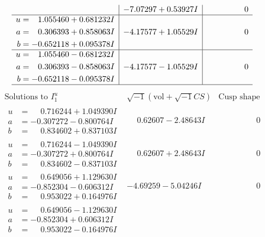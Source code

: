 \documentclass[1p]{elsarticle_modified}
\theoremstyle{definition}
\newcommand{\I}{\sqrt{-1}}
\begin{document}
$$\begin{array}{c|c|c}
 & -7.07297 + 0.53927 I & \phantom{-0.000000 } 0 \\ \hline\begin{aligned}
u &= \phantom{-}1.055460 + 0.681232 I \\
a &= \phantom{-}0.306393 + 0.858063 I \\
b &= -0.652118 + 0.095378 I\end{aligned}
 & -4.17577 + 1.05529 I & \phantom{-0.000000 } 0 \\ \hline\begin{aligned}
u &= \phantom{-}1.055460 - 0.681232 I \\
a &= \phantom{-}0.306393 - 0.858063 I \\
b &= -0.652118 - 0.095378 I\end{aligned}
 & -4.17577 - 1.05529 I & \phantom{-0.000000 } 0\\
 \hline 
 \end{array}$$\newpage$$\begin{array}{c|c|c}  
\text{Solutions to }I^u_{1}& \I (\text{vol} + \sqrt{-1}CS) & \text{Cusp shape}\\
 \hline 
\begin{aligned}
u &= \phantom{-}0.716244 + 1.049390 I \\
a &= -0.307272 - 0.800764 I \\
b &= \phantom{-}0.834602 + 0.837103 I\end{aligned}
 & \phantom{-}0.62607 - 2.48643 I & \phantom{-0.000000 } 0 \\ \hline\begin{aligned}
u &= \phantom{-}0.716244 - 1.049390 I \\
a &= -0.307272 + 0.800764 I \\
b &= \phantom{-}0.834602 - 0.837103 I\end{aligned}
 & \phantom{-}0.62607 + 2.48643 I & \phantom{-0.000000 } 0 \\ \hline\begin{aligned}
u &= \phantom{-}0.649056 + 1.129630 I \\
a &= -0.852304 - 0.606312 I \\
b &= \phantom{-}0.953022 + 0.164976 I\end{aligned}
 & -4.69259 - 5.04246 I & \phantom{-0.000000 } 0 \\ \hline\begin{aligned}
u &= \phantom{-}0.649056 - 1.129630 I \\
a &= -0.852304 + 0.606312 I \\
b &= \phantom{-}0.953022 - 0.164976 I\end{aligned}

\end{array}$$
\end{document}
